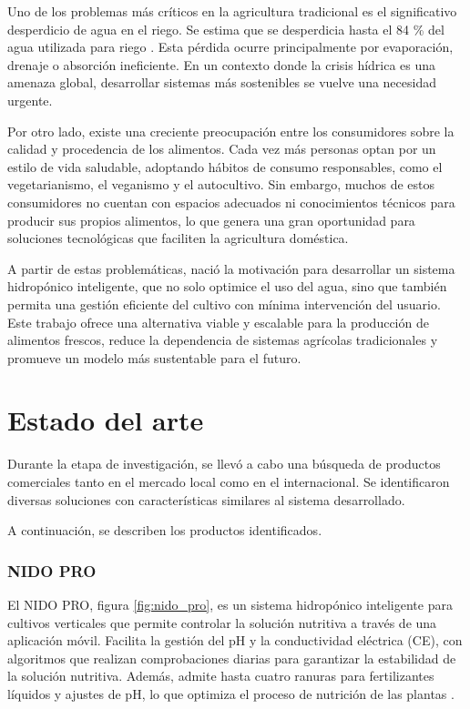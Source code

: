 Uno de los problemas más críticos en la agricultura tradicional es el significativo desperdicio de agua en el riego. Se estima que se desperdicia hasta el 84 \% del agua utilizada para riego \cite{CLARIN}. Esta pérdida ocurre principalmente por evaporación, drenaje o absorción ineficiente. En un contexto donde la crisis hídrica es una amenaza global, desarrollar sistemas más sostenibles se vuelve una necesidad urgente.

Por otro lado, existe una creciente preocupación entre los consumidores sobre la calidad y procedencia de los alimentos. Cada vez más personas optan por un estilo de vida saludable, adoptando hábitos de consumo responsables, como el vegetarianismo, el veganismo y el autocultivo. Sin embargo, muchos de estos consumidores no cuentan con espacios adecuados ni conocimientos técnicos para producir sus propios alimentos, lo que genera una gran oportunidad para soluciones tecnológicas que faciliten la agricultura doméstica.

A partir de estas problemáticas, nació la motivación para desarrollar un sistema hidropónico inteligente, que no solo optimice el uso del agua, sino que también permita una gestión eficiente del cultivo con mínima intervención del usuario. Este trabajo ofrece una alternativa viable y escalable para la producción de alimentos frescos, reduce la dependencia de sistemas agrícolas tradicionales y promueve un modelo más sustentable para el futuro.


\section{Estado del arte}
Durante la etapa de investigación, se llevó a cabo una búsqueda de productos comerciales tanto en el mercado local como en el internacional. Se identificaron diversas soluciones con características similares al sistema desarrollado.

A continuación, se describen los productos identificados.

\subsubsection{NIDO PRO}
El NIDO PRO, figura \ref{fig:nido_pro}, es un sistema hidropónico inteligente para cultivos verticales que permite controlar la solución nutritiva a través de una aplicación móvil. Facilita la gestión del pH y la conductividad eléctrica (CE), con algoritmos que realizan comprobaciones diarias para garantizar la estabilidad de la solución nutritiva. Además, admite hasta cuatro ranuras para fertilizantes líquidos y ajustes de pH, lo que optimiza el proceso de nutrición de las plantas \cite{NIDO:PRO}.

